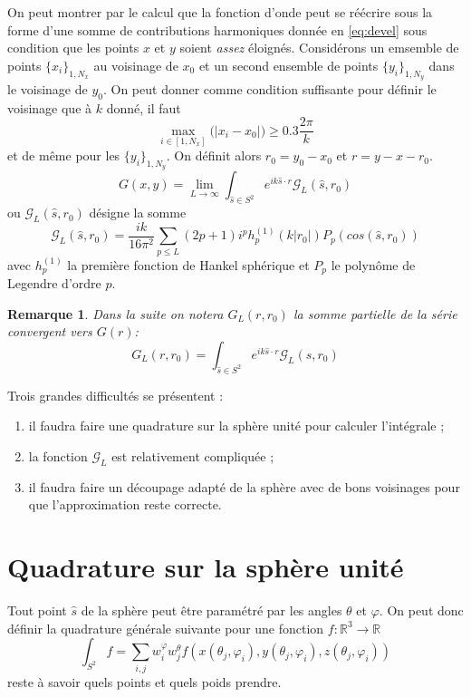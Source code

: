 \documentclass[11pt]{article}
\newtheorem{rmq}{Remarque}
\newcommand{\R}{\mathbb{R}}
\newcommand{\hs}{\hat{s}}
\newcommand{\lG}{\mathcal{G}}
\begin{document}
On peut montrer par le calcul que la fonction d'onde peut se réécrire sous la forme d'une somme de contributions harmoniques donnée en
\ref{eq:devel} sous condition que les points $x$ et $y$ soient \emph{assez} éloignés. Considérons un emsemble de points $\{x_i\}_{1, N_x}$ au
voisinage de $x_0$ et un second ensemble de points $\{y_i\}_{1, N_y}$ dans le voisinage de $y_0$. On peut donner comme condition suffisante
pour définir le voisinage que à $k$ donné, il faut
\[
  \max_{i\in[1,N_x]}\big(|x_i-x_0|\big)\geq 0.3 \frac{2\pi}{k}
\]
et de même pour les $\{y_i\}_{1, N_y}$. On définit alors $r_0 = y_0-x_0$ et $r=y-x-r_0$.
\begin{equation}
  \label{eq:devel}
  G(x, y) = \lim_{L\to\infty} \int_{\hs\in S^2} e^{ik \hs \cdot r} \lG_L(\hs, r_0)
\end{equation}
ou $\lG_L(\hs, r_0)$ désigne la somme
\begin{equation}
  \label{eq:GL}
  \lG_L(\hs, r_0) = \frac{ik}{16\pi^2} \sum_{p\leq L} (2p+1) i^p h_p^{(1)}(k|r_0|) P_p(cos(\hs, r_0))
\end{equation}
avec $h_p^{(1)}$ la première fonction de Hankel sphérique et $P_p$ le polynôme de Legendre d'ordre $p$.

\begin{rmq}
  Dans la suite on notera $G_L(r, r_0)$ la somme partielle de la série convergent vers $G(r)$:
  \[
    G_L(r, r_0) = \int_{\hs\in S^2} e^{ik \hs \cdot r} \lG_L(\hs, r_0)
  \]
\end{rmq}
Trois grandes difficultés se présentent :
\begin{enumerate}
\item il faudra faire une quadrature sur la sphère unité pour calculer l'intégrale ;
\item la fonction $\lG_L$ est relativement compliquée ;
\item il faudra faire un découpage adapté de la sphère avec de bons voisinages pour que l'approximation reste correcte.
\end{enumerate}

\section{Quadrature sur la sphère unité}

Tout point $\hs$ de la sphère peut être paramétré par les angles $\theta$ et $\varphi$. On peut donc définir la quadrature générale suivante
pour une fonction $f : \R^3 \to \R$
\[
  \int_{S^2} f = \sum_{i, j} w^\varphi_i w^\theta_j f(x(\theta_j, \varphi_i), y(\theta_j, \varphi_i), z(\theta_j, \varphi_i))
\]
reste à savoir quels points et quels poids prendre.
\end{document}
